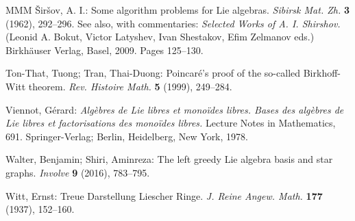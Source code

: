 \documentclass[11pt,a4paper]{amsart}
\newcommand{\gbibitem}[1]{ \bibitem{#1}}
\newcommand{\gbibitem}[1]{ \bibitem{#1}\rlap{\smash{${}^{^{[#1]}}$}}}
\newenvironment{commentx}{\color{magenta} }{\color{black} }
\newcommand{\gbibitem}[1]{ \bibitem{#1}}
\theoremstyle{definition}
\theoremstyle{plain}
\begin{document}
\begin{thebibliography}{MMM}
\begin{commentx}
\gbibitem{S4}
\v{S}ir\v{s}ov, A. I.:
Some algorithm problems for Lie algebras.
\textit{Sibirsk Mat. Zh.} \textbf{3} (1962),  292--296.
See also, with commentaries:
\textit{Selected Works of A. I. Shirshov.}
(Leonid A. Bokut,
Victor Latyshev,
Ivan Shestakov,
Efim Zelmanov eds.)
Birkh\"auser Verlag, Basel, 2009.
Pages 125--130.
\end{commentx}

\gbibitem{TT}
Ton-That, Tuong; Tran, Thai-Duong:
Poincar\'e's proof of the so-called Birkhoff-Witt theorem.
\textit{Rev. Histoire Math.}  \textbf{5}  (1999),   249--284.


\gbibitem{V}
Viennot, G\'erard:
\textit{Alg\`{e}bres de Lie libres et mono\"ides libres.
Bases des alg\`ebres de Lie libres et factorisations des mono\"ides libres.}
Lecture Notes in Mathematics, 691.
Springer-Verlag; Berlin, Heidelberg, New York, 1978.



\gbibitem{WS}
Walter, Benjamin; Shiri, Aminreza:
The left greedy Lie algebra basis and star graphs.
\textit{Involve} \textbf{9} (2016), 783--795.




\gbibitem{W}
Witt, Ernst:
Treue Darstellung Liescher Ringe.
\textit{J. Reine Angew. Math.}  \textbf{177}  (1937), 152--160.

\end{thebibliography}
\end{document}
